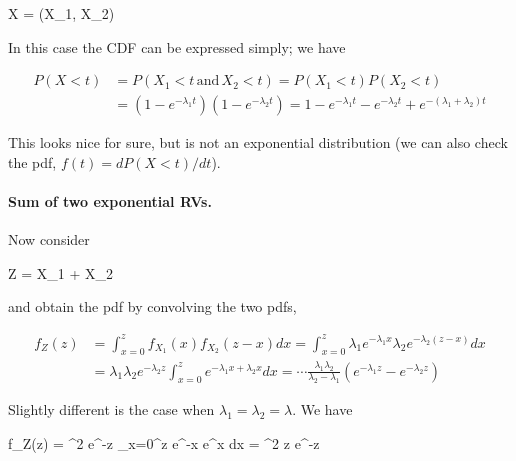 \bee
X = \max (X_1, X_2)
\eee 

In this case the CDF can be expressed simply; we have

\begin{align*}
P(X < t) &= P( X_1 < t \, \text{and} \, X_2 < t) = P(X_1 < t) P(X_2 < t) \\
&= (1-e^{-\lambda_1 t})(1-e^{-\lambda_2 t}) = 1 - e^{-\lambda_1 t} - e^{-\lambda_2 t} + e^{-(\lambda_1 + \lambda_2)t}
\end{align*}

This looks nice for sure, but is not an exponential distribution (we can also check the pdf, $f(t) = dP(X<t) / dt$).


\paragraph{Sum of two exponential RVs.} Now consider

\bee
Z = X_1 + X_2
\eee

and obtain the pdf by convolving the two pdfs,

\begin{align*}
f_Z(z) &= \int_{x=0}^z f_{X_1}(x) f_{X_2}(z - x) dx = \int_{x=0}^z \lambda_1 e^{-\lambda_1 x} \lambda_2 e^{-\lambda_2(z-x)} dx \\ &= \lambda_1 \lambda_2 e^{-\lambda_2 z} \int_{x=0}^z e^{-\lambda_1 x + \lambda_2 x} dx = \cdots \frac{\lambda_1 \lambda_2}{\lambda_2 - \lambda_1} \left( e^{-\lambda_1 z} - e^{-\lambda_2 z} \right)
\end{align*}

Slightly different is the case when $\lambda_1 = \lambda_2 = \lambda$. We have

\bee
f_Z(z) = \lambda^2 e^{-\lambda z} \int_{x=0}^z e^{-\lambda x} e^{\lambda x} dx = \lambda^2 z e^{-\lambda z}
\eee

